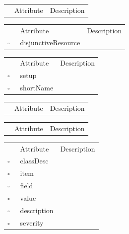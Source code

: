 \begin{table}
\caption{DataGeneratorRun  }

\begin{longtable}{llp{8cm}}
& Attribute & Description \\
\end{longtable}
\label{attr:DataGeneratorRun}
\end{table}

\begin{table}
\caption{DisjunctiveLowerBound  }

\begin{longtable}{llp{8cm}}
& Attribute & Description \\
$\square$\ & disjunctiveResource &  \\
\end{longtable}
\label{attr:DisjunctiveLowerBound}
\end{table}

\begin{table}
\caption{DisjunctiveResource  }

\begin{longtable}{llp{8cm}}
& Attribute & Description \\
$\square$\ & setup &  \\
$\square$\ & shortName &  \\
\end{longtable}
\label{attr:DisjunctiveResource}
\end{table}

\clearpage
\begin{table}
\caption{Downtime  }

\begin{longtable}{llp{8cm}}
& Attribute & Description \\
\end{longtable}
\label{attr:Downtime}
\end{table}

\begin{table}
\caption{GanttProperty  }

\begin{longtable}{llp{8cm}}
& Attribute & Description \\
\end{longtable}
\label{attr:GanttProperty}
\end{table}

\begin{table}
\caption{InputError  }

\begin{longtable}{llp{8cm}}
& Attribute & Description \\
$\square$\ & classDesc &  \\
$\square$\ & item &  \\
$\square$\ & field &  \\
$\square$\ & value &  \\
$\square$\ & description &  \\
$\square$\ & severity &  \\
\end{longtable}
\label{attr:InputError}
\end{table}

